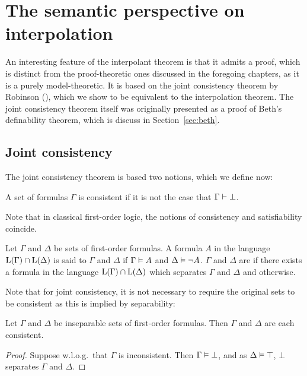 
\chapter{The semantic perspective on interpolation}
\label{chap:semantic}

An interesting feature of the interpolant theorem is that it admits a proof, which is distinct from the proof-theoretic ones discussed in the foregoing chapters, as it is a purely model-theoretic.
It is based on the joint consistency theorem by Robinson (\cite{robinson1956result}), which we show to be equivalent to the interpolation theorem.
The joint consistency theorem itself was originally presented as a proof of Beth's definability theorem, which is discuss in Section~\ref{sec:beth}.

\section{Joint consistency}
\label{sec:joint_consistency}

The joint consistency theorem is based two notions, which we define now:

\begin{defi}[Consistency]
	A set of formulas $\Gamma$ is consistent if it is not the case that $\Gamma \vdash \bot$.
\end{defi}

Note that in classical first-order logic, the notions of consistency and satisfiability coincide.

\begin{defi}[Separability]
	Let $\Gamma$ and $\Delta$ be sets of first-order formulas.
	A formula $A$ in the language $\operatorname{L}(\Gamma)\cap \operatorname{L}(\Delta)$ is said to  $\Gamma$ and $\Delta$ if $\Gamma \vDash A$ and $\Delta \vDash \lnot A$.
	$\Gamma$ and $\Delta$ are  if there exists a formula in the language $\operatorname{L}(\Gamma)\cap \operatorname{L}(\Delta)$ which separates $\Gamma$ and $\Delta$ and  otherwise.
\end{defi}

Note that for joint consistency, it is not necessary to require the original sets to be consistent as this is implied by separability:

\begin{lemma}
	\label{lemma:insep_consistent}
	Let $\Gamma$ and $\Delta$ be inseparable sets of first-order formulas. Then $\Gamma$ and $\Delta$ are each consistent.
\end{lemma}
\begin{proof}
	Suppose w.l.o.g.\ that $\Gamma$ is inconsistent. Then $\Gamma \vDash \bot$, and as $\Delta \vDash \top$, $\bot$ separates $\Gamma$ and $\Delta$.
\end{proof}


